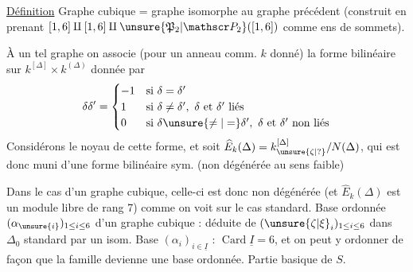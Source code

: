 \uline{Définition} Graphe cubique = graphe isomorphe au graphe  précédent (construit en prenant  $[1,6]\amalg[1,6]\amalg\unsure{\mathfrak P_2|\mathscr P_2}([1,6])$ comme ens de sommets).

À un tel graphe  on associe (pour un anneau comm. $k$ donné) la forme bilinéaire  sur $k^{[\Delta]}\times k^{(\Delta)}$ donnée par
\[
\delta\delta'=\begin{cases}
-1&\text{si }\delta=\delta'\\
1&\text{si }\delta\ne\delta',\ \delta\text{ et }\delta'\text{ liés}\\
0&\text{si }\delta\unsure{\ne|=}\delta',\ \delta\text{ et }\delta'\text{ non liés}
\end{cases}
\]
Considérons le noyau  de cette forme, et soit $\widehat E_k(\Delta)=k_{\unsure{\zeta|?}}^{[\Delta]}/N(\Delta)$, qui est donc muni d'une forme bilinéaire sym. (non dégénérée au sens faible)

Dans le cas d'un graphe cubique, celle-ci est donc non dégénérée (et $\widehat E_k(\Delta)$ est un module libre de rang 7) comme on voit sur le cas standard.
Base ordonnée $(\alpha_{\unsure{i}})_{1\le i\le6}$ d'un graphe cubique : déduite de $(\unsure{\zeta|\xi}_i)_{1\le i\le6}$ dans $\Delta_0$ standard par  un isom. Base $(\alpha_i)_{i\in\underline I}$ : $\operatorname{Card}\underline I=6$, et on peut y ordonner  de façon que la famille devienne une base ordonnée. Partie basique de $S$.

